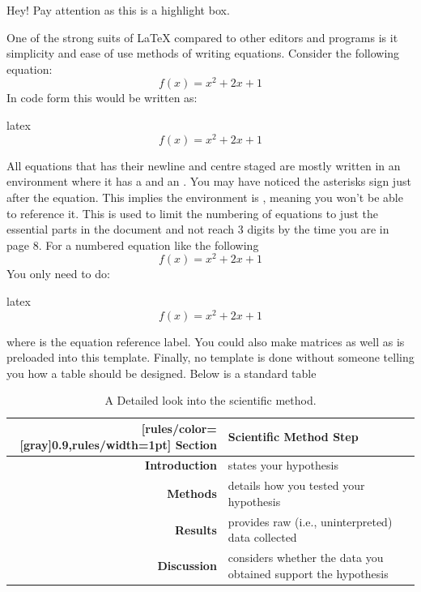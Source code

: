 \documentclass[minted, draw]{../tex/hebdomon}
\begin{document}
\begin{highlight}
	Hey! Pay attention as this is a highlight box.
\end{highlight}

%
One of the strong suits of LaTeX compared to other editors and programs is
it simplicity and ease of use methods of writing equations. Consider the
following equation:
%
\begin{equation*}
	f(x) = x^2 + 2x + 1
\end{equation*}
%
In code form this would be written as:
%
\begin{code}{latex}
	\begin{equation*}
		f(x) = x^2 + 2x + 1
	\end{equation*}
\end{code}
%
All equations that has their newline and centre staged are mostly written
in an environment where it has a  and an . You may
have noticed the asterisks sign just after the equation. This implies the
environment is , meaning you won't be able to
reference it. This is used to limit the numbering of equations to just the
essential parts in the document and not reach 3 digits by the time you are
in page 8. For a numbered equation like the following
%
\begin{equation}
	f(x) = x^2 + 2x + 1
\end{equation}
%
You only need to do:
%
\begin{code}{latex}
	\begin{equation}\label{eq:quad}
		f(x) = x^2 + 2x + 1
	\end{equation}
\end{code}
% 
where \pcode{\label{eq:quad}} is the equation reference label.
%
You could also make matrices as well as  is preloaded into this template.
%
%
Finally, no template is done without someone telling you how a table should be designed.
%
Below is a standard table
%
\begin{table}[!ht]
	\begin{NiceTabular}{rX}[rules/color=[gray]{0.9},rules/width=1pt]
		\CodeBefore
		\Body
		\toprule
		\textbf{Section}      & \textbf{Scientific Method Step}                                \\
		\midrule
		\textbf{Introduction} & states your hypothesis                                         \\
		\textbf{Methods}      & details how you tested your hypothesis                         \\
		\textbf{Results}      & provides raw (i.e., uninterpreted) data collected              \\
		\textbf{Discussion}   & considers whether the data you obtained support the hypothesis \\
		\bottomrule
	\end{NiceTabular}
	\caption{A Detailed look into the scientific method.}
\end{table}
\end{document}
